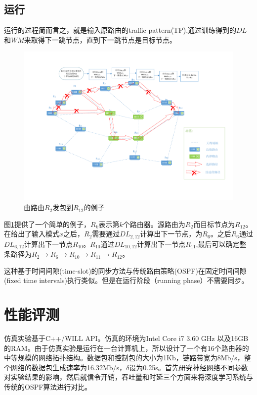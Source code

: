 \documentclass[a4paper, 11pt]{article}
\begin{document}
\begin{CJK*}{UTF8}{gbsn}
\subsection{运行}
运行的过程简而言之，就是输入原路由的traffic pattern(TP),通过训练得到的$DL$和$WM$来取得下一跳节点，直到下一跳节点是目标节点。
\begin{figure}[htb]
\centering
\includegraphics[width=\textwidth]{routing_algorithm.pdf}
\caption{由路由$R_2$发包到$R_{12}$的例子}\label{fig:routing_algorithm}
\end{figure}
图\ref{fig:routing_algorithm}提供了一个简单的例子，$R_k$表示第$k$个路由器。源路由为$R_2$而目标节点为$R_{12}$。在给出了输入模式$\hat{x}$之后，$R_2$需要通过$DL_{2,12}$计算出下一节点，为$R_6$。之后$R_6$通过$DL_{6,12}$计算出下一节点$R_{10}$。$R_{10}$通过$DL_{10,12}$计算出下一节点$R_{11}$,最后可以确定整条路径为$R_{2}\rightarrow R_{6}\rightarrow R_{10} \rightarrow R_{11}\rightarrow R_{12}$。

这种基于时间间隙(time-slot)的同步方法与传统路由策略(OSPF)在固定时间间隙(fixed time intervals)执行类似。但是在运行阶段（running phase）不需要同步。

\section{性能评测}
仿真实验基于C++/WILL API\cite{WILL}。仿真的环境为Intel Core i7 3.60 GHz 以及16GB的RAM。由于仿真实验是运行在一台计算机上，所以设计了一个有16个路由器的中等规模的网络拓扑结构。数据包和控制包的大小为1Kb，链路带宽为8Mb/s，整个网络的数据包生成速率为16.32Mb/s，$\delta$设为0.25s。\cite{Kato2017:MWC}首先研究神经网络不同参数对实验结果的影响，然后就信令开销，吞吐量和时延三个方面来将深度学习系统与传统的OSPF算法进行对比。


\end{CJK*}
\end{document}
